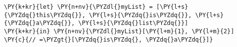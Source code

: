 \begin{Verbatim}[commandchars=\\\{\}]
\PY{k+kr}{let} \PY{n+nv}{\PYZdl{}myList} = [\PY{l+s}{\PYZdq{}this\PYZdq{}}, \PY{l+s}{\PYZdq{}is\PYZdq{}}, \PY{l+s}{\PYZdq{}a\PYZdq{}}, \PY{l+s}{\PYZdq{}list\PYZdq{}}]
\PY{k+kr}{in} \PY{n+nv}{\PYZdl{}myList}[\PY{l+m}{1}, \PY{l+m}{2}] \PY{c}{// =\PYZgt{}[\PYZdq{}is\PYZdq{}, \PYZdq{}a\PYZdq{}]}
\end{Verbatim}
